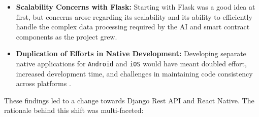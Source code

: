 \begin{itemize}
    \item \textbf{Scalability Concerns with Flask:} Starting with Flask was a good idea at first, but concerns arose regarding its scalability and its ability to efficiently handle the complex data processing \cite{Ghimire2020, CopperwaiteEtAl2015} required by the AI and smart contract components as the project grew.
    \item \textbf{Duplication of Efforts in Native Development:} Developing separate native applications for \texttt{Android} and \texttt{iOS} would have meant doubled effort, increased development time, and challenges in maintaining code consistency across platforms \cite{MasielloEtAl2017}.
\end{itemize}

These findings led to a change towards Django Rest API and React Native. The rationale behind this shift was multi-faceted:

